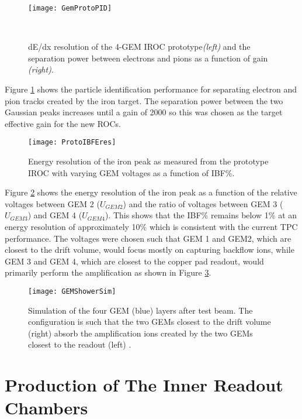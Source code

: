 \begin{figure}[h]
\texttt{[image: GemProtoPID]}
\centering
\caption{dE/dx resolution of the 4-GEM IROC prototype\textit{(left)} and the separation power between electrons and pions as a function of gain \textit{(right)}\cite{CERN-LHCC-2015-002}.}\

\label{fig:GemProtoPID}
\end{figure}

Figure \ref{fig:GemProtoPID} shows the particle identification performance for separating electron and pion tracks created by the iron target.  The separation power between the two Gaussian peaks increases until a gain of 2000 so this was chosen as the target effective gain for the new ROCs.



\begin{figure}[h]
\texttt{[image: ProtoIBFEres]}
\centering
\caption{Energy resolution of the iron peak as measured from the prototype IROC with varying GEM voltages as a function of IBF\%\cite{CERN-LHCC-2015-002}.}
\label{fig:ProtoIBFEres}
\end{figure}


Figure \ref{fig:ProtoIBFEres} shows the energy resolution of the iron peak as a function of the relative voltages between GEM 2 ($U_{GEM2}$) and the ratio of voltages between GEM 3 ($U_{GEM3}$) and GEM 4 ($U_{GEM4}$).  This shows that the IBF\% remains below 1\% at an energy resolution of approximately 10\% which is consistent with the current TPC performance.  The voltages were chosen such that GEM 1 and GEM2, which are closest to the drift volume, would focus mostly on capturing backflow ions, while GEM 3 and GEM 4, which are closest to the copper pad readout, would primarily perform the amplification as shown in Figure \ref{fig:showersim}.

\begin{figure}[h]
\texttt{[image: GEMShowerSim]}
\centering
\caption{Simulation of the four GEM (blue) layers after test beam.  The configuration is such that the two GEMs closest to the drift volume (right) absorb the amplification ions created by the two GEMs closest to the readout (left) \cite{CERN-LHCC-2015-002}.}
\label{fig:showersim}
\end{figure}

\section{Production of The Inner Readout Chambers}


